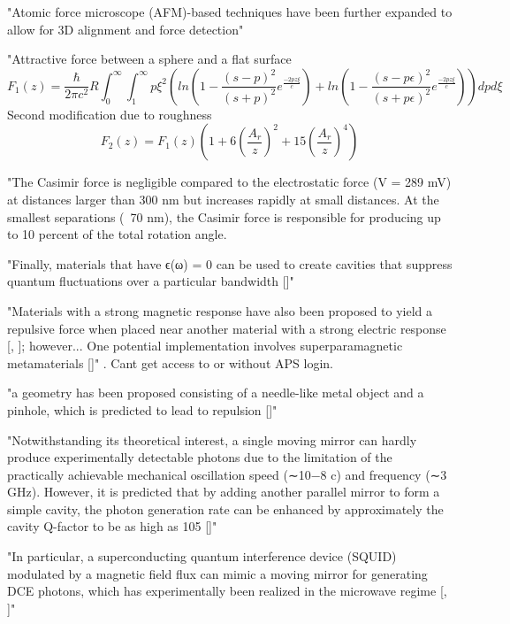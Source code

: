 \documentclass[12pt]{article}
\begin{document}
     "Atomic force microscope (AFM)-based techniques have been further expanded to allow for 3D alignment and force detection" \cite{Gong}

     "Attractive force between a sphere and a flat surface
     \begin{equation}
         F_1(z) = \frac{\hbar}{2 \pi c^2} R \int_0^\infty \int_1^\infty p \xi^2 \left( ln(1-\frac{(s-p)^2}{(s+p)^2} e^{\frac{-2 p z \xi}{c}}) + ln(1 - \frac{(s-p\epsilon)^2}{(s+p \epsilon)^2} e^{\frac{-2 p z \xi}{c}}) \right) dp d\xi
     \end{equation}
     Second modification due to roughness
     \begin{equation}
         F_2(z) = F_1(z) \left( 1 + 6 \left(\frac{A_r}{z}\right)^2 + 15 \left(\frac{A_r}{z}\right)^4 \right)
     \end{equation}
     \cite{Chan}

     "The Casimir force is negligible compared to the electrostatic force (V = 289 mV) at distances larger than 300 nm but increases rapidly at small distances. At the smallest separations (~70 nm), the Casimir force is responsible for producing up to 10 percent of the total rotation angle. \cite{Chan}

     "Finally, materials that have ϵ(ω) = 0 can be used to create cavities that suppress quantum fluctuations over a particular bandwidth [\cite{ZeroIndex}]" \cite{Gong}

     "Materials with a strong magnetic response have also been proposed to yield a repulsive force when placed near another material with a strong electric response [\cite{PhysRevA.9.2078}, \cite{PhysRevLett.89.033001}]; however... One potential implementation involves superparamagnetic metamaterials [\cite{PhysRevLett.103.120401}]" \cite{Gong}. 
     Cant get access to \cite{PhysRevLett.103.120401} or \cite{PhysRevA.9.2078}without APS login.

     "a geometry has been proposed consisting of a needle-like metal object and a pinhole, which is predicted to lead to repulsion [\cite{PhysRevLett.105.090403}]" \cite{Gong}

     "Notwithstanding its theoretical interest, a single moving mirror can hardly produce experimentally detectable photons due to the limitation of the practically  achievable mechanical oscillation speed (∼10−8 c) and frequency (∼3 GHz). However, it is predicted that by adding another parallel mirror to form a simple cavity, the photon generation rate can be enhanced by approximately the cavity Q-factor to be as high as 105 [\cite{PhysRevA.54.3420}]" \cite{Gong}

     "In particular, a superconducting quantum interference device (SQUID) modulated by a magnetic field flux can mimic a moving mirror for generating DCE photons, which has experimentally been realized in the microwave regime [\cite{Nature479.376}, ]" \cite{Gong}

\printbibliography
\end{document}
